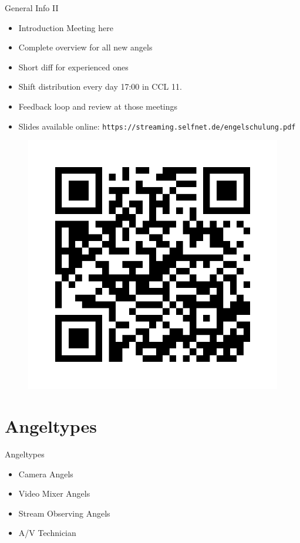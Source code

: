 \documentclass[aspectratio=169]{beamer}
\begin{document}
\begin{frame}{General Info II}
	\begin{itemize}
		\item Introduction Meeting here
		\item Complete overview for all new angels
		\item Short diff for experienced ones
		\item Shift distribution every day 17:00 in CCL 11.
		\item Feedback loop and review at those meetings
		\item Slides available online: \texttt{https://streaming.selfnet.de/engelschulung.pdf}
	\end{itemize}
	\begin{figure} 
		\centering
		\includegraphics[height=0.4\textheight]{images/qrcode.png}
	\end{figure}
\end{frame}

\section{Angeltypes}
\begin{frame}{Angeltypes}
	\begin{itemize}
		\item Camera Angels
		\item Video Mixer Angels
		\item Stream Observing Angels
		\item A/V Technician
	\end{itemize}
\end{frame}
\end{document}
